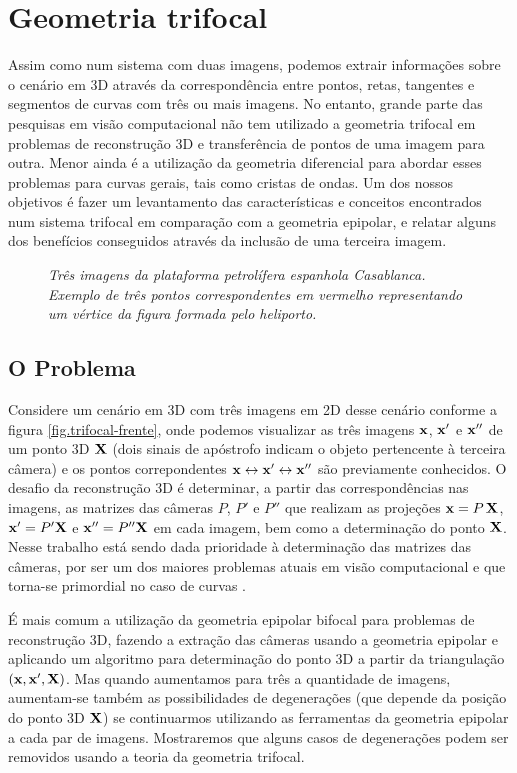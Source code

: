 \newpage
\section{Geometria trifocal}\label{sec.geo-tri}
Assim como num sistema com duas imagens, podemos extrair informações sobre o cenário em 3D através da correspondência entre pontos, retas, tangentes e segmentos de curvas com três  ou mais imagens. No entanto, grande parte das pesquisas em visão computacional não tem utilizado a geometria trifocal em problemas de reconstrução 3D e transferência de pontos de uma imagem para outra. Menor ainda é a utilização da geometria diferencial para abordar esses problemas para curvas gerais, tais como cristas de ondas. Um dos nossos objetivos é fazer um levantamento das características e conceitos encontrados num sistema trifocal em comparação com a geometria epipolar, e relatar alguns dos benefícios conseguidos através da inclusão de uma terceira imagem.

\begin{figure}[htb!]
\centering
{}
\quad
{}
\quad
{}
\caption{{\it Três imagens da plataforma petrolífera espanhola Casablanca. Exemplo de três pontos correspondentes em vermelho representando um vértice da figura formada pelo heliporto.}}
\end{figure}

\subsection{O Problema}
Considere um cenário em 3D com três imagens em 2D desse cenário conforme a figura \ref{fig.trifocal-frente}, onde podemos visualizar as três imagens $\mathbf{x}$, $\mathbf{x}'$ e $\mathbf{x}''$ de um ponto 3D $\mathbf{X}$ (dois sinais de apóstrofo indicam o objeto pertencente à terceira câmera) e os pontos correpondentes $\mathbf{x}\leftrightarrow\mathbf{x}'\leftrightarrow\mathbf{x}''$ são previamente conhecidos. O desafio da reconstrução 3D é determinar, a partir das correspondências nas imagens, as matrizes das câmeras $P$, $P'$ e $P''$ que realizam as projeções $\mathbf{x}=P\,\mathbf{X}$, $\mathbf{x}'=P'\mathbf{X}$ e $\mathbf{x}''=P''\mathbf{X}$ em cada imagem, bem como a determinação do ponto $\mathbf{X}$. Nesse trabalho está sendo dada prioridade à determinação das matrizes das câmeras, por ser um dos maiores problemas atuais em visão computacional e que torna-se primordial no caso de curvas \citep{tese-fabbri}.

É mais comum a utilização da geometria epipolar bifocal para problemas de reconstrução 3D, fazendo a extração das câmeras usando a geometria epipolar e aplicando um algoritmo para determinação do ponto 3D a partir da triangulação $(\mathbf{x},\mathbf{x}',\mathbf{X})$. Mas quando aumentamos para três a quantidade de imagens, aumentam-se também as possibilidades de degenerações (que depende  da posição do ponto 3D $\mathbf{X}$) se continuarmos utilizando as ferramentas da geometria epipolar a cada par de imagens. Mostraremos que alguns casos de degenerações podem ser removidos usando a teoria da geometria trifocal.


